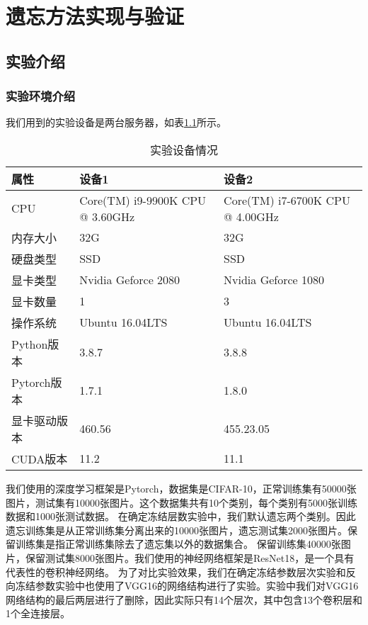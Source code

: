 
\chapter{遗忘方法实现与验证}

\section{实验介绍}

\subsection{实验环境介绍}
我们用到的实验设备是两台服务器，如表\ref{tab:experiment-deivce}所示。
\begin{table}
    \centering
    \caption{实验设备情况}
    \begin{tabular}{lll}
      \toprule
      属性  & 设备1 & 设备2  \\
      \midrule
      CPU   & Core(TM) i9-9900K CPU @ 3.60GHz & Core(TM) i7-6700K CPU @ 4.00GHz \\
      内存大小  & 32G & 32G                    \\
      硬盘类型 & SSD  & SSD  \\
      显卡类型 & Nvidia Geforce 2080  & Nvidia Geforce 1080  \\
      显卡数量 & 1  & 3  \\
      操作系统 & Ubuntu 16.04LTS  & Ubuntu 16.04LTS  \\
      Python版本 & 3.8.7  & 3.8.8  \\
      Pytorch版本 & 1.7.1  & 1.8.0  \\
      显卡驱动版本 & 460.56  & 455.23.05  \\
      CUDA版本 & 11.2  & 11.1  \\
      \bottomrule
    \end{tabular}
    \label{tab:experiment-deivce}
\end{table}

我们使用的深度学习框架是Pytorch，数据集是CIFAR-10\cite{cifar10_2009}，正常训练集有50000张图片，测试集有10000张图片。这个数据集共有10个类别，每个类别有5000张训练数据和1000张测试数据。
在确定冻结层数实验中，我们默认遗忘两个类别。因此遗忘训练集是从正常训练集分离出来的10000张图片，遗忘测试集2000张图片。保留训练集是指正常训练集除去了遗忘集以外的数据集合。
保留训练集40000张图片，保留测试集8000张图片。我们使用的神经网络框架是ResNet18\cite{He_2016_CVPR}，是一个具有代表性的卷积神经网络。
为了对比实验效果，我们在确定冻结参数层次实验和反向冻结参数实验中也使用了VGG16\cite{Simonyan15}的网络结构进行了实验。实验中我们对VGG16网络结构的最后两层进行了删除，因此实际只有14个层次，其中包含13个卷积层和1个全连接层。

